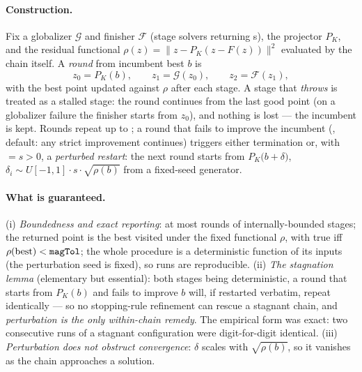 \paragraph{Construction.} Fix a globalizer $\mathcal{G}$ and finisher
$\mathcal{F}$ (stage solvers returning s), the projector
$P_K$, and the residual functional $\rho(z) = \|z - P_K(z - F(z))\|^2$
evaluated by the chain itself. A \emph{round} from incumbent best $b$ is
\[
z_0 = P_K(b), \qquad
z_1 = \mathcal{G}(z_0), \qquad
z_2 = \mathcal{F}(z_1),
\]
with the best point updated against $\rho$ after each stage. A stage that
\emph{throws} is treated as a stalled stage: the round continues from the
last good point (on a globalizer failure the finisher starts from $z_0$),
and nothing is lost --- the incumbent is kept. Rounds repeat up to
; a round that fails to improve the incumbent
(, default: any strict improvement continues) triggers
either termination or, with  $= s > 0$, a
\emph{perturbed restart}: the next round starts from
$P_K\bigl(b + \delta\bigr)$, $\delta_i \sim U[-1,1]\cdot s\cdot
\sqrt{\rho(b)}$ from a fixed-seed generator.

\paragraph{What is guaranteed.} (i) \emph{Boundedness and exact
reporting}: at most  rounds of internally-bounded stages;
the returned point is the best visited under the fixed functional $\rho$,
with  true iff $\rho(\mathrm{best}) < \texttt{magTol}$; the
whole procedure is a deterministic function of its inputs (the
perturbation seed is fixed), so runs are reproducible. (ii) \emph{The
stagnation lemma} (elementary but essential): both stages being
deterministic, a round that starts from $P_K(b)$ and fails to improve $b$
will, if restarted verbatim, repeat identically --- so no stopping-rule
refinement can rescue a stagnant chain, and \emph{perturbation is the only
within-chain remedy}. The empirical form was exact: two consecutive runs
of a stagnant configuration were digit-for-digit identical. (iii)
\emph{Perturbation does not obstruct convergence}: $\delta$ scales with
$\sqrt{\rho(b)}$, so it vanishes as the chain approaches a solution.

